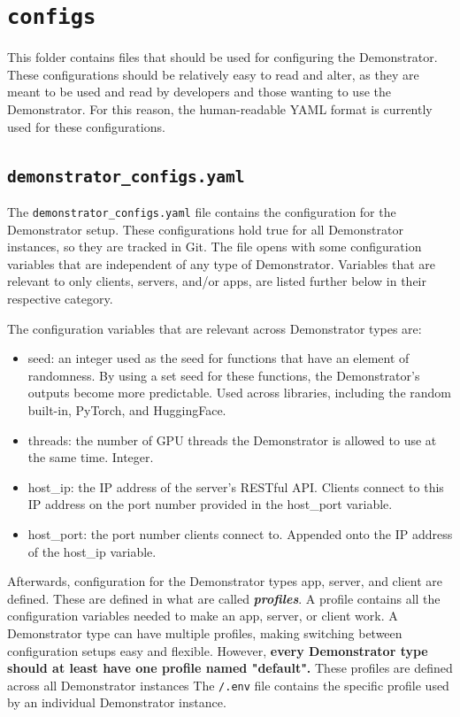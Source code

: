 \section{\texttt{configs}}
This folder contains files that should be used for configuring the Demonstrator.
These configurations should be relatively easy to read and alter, as they are meant to be used and read by developers and those wanting to use the Demonstrator.
For this reason, the human-readable YAML format is currently used for these configurations.

\subsection{\texttt{demonstrator\_configs.yaml}}
The \texttt{demonstrator\_configs.yaml} file contains the configuration for the Demonstrator setup.
These configurations hold true for all Demonstrator instances, so they are tracked in Git.
The file opens with some configuration variables that are independent of any type of Demonstrator.
Variables that are relevant to only clients, servers, and/or apps, are listed further below in their respective category.

The configuration variables that are relevant across Demonstrator types are:
\begin{itemize}
    \item seed: an integer used as the seed for functions that have an element of randomness. By using a set seed for these functions, the Demonstrator's outputs become more predictable. Used across libraries, including the random built-in, PyTorch, and HuggingFace.
    \item threads: the number of GPU threads the Demonstrator is allowed to use at the same time. Integer.
    \item host\_ip: the IP address of the server's RESTful API. Clients connect to this IP address on the port number provided in the host\_port variable.
    \item host\_port: the port number clients connect to. Appended onto the IP address of the host\_ip variable.
\end{itemize}

Afterwards, configuration for the Demonstrator types app, server, and client are defined.
These are defined in what are called \textbf{\textit{profiles}}.
A profile contains all the configuration variables needed to make an app, server, or client work.
A Demonstrator type can have multiple profiles, making switching between configuration setups easy and flexible.
However, \textbf{every Demonstrator type should at least have one profile named "default".}
These profiles are defined across all Demonstrator instances
The \texttt{/.env} file contains the specific profile used by an individual Demonstrator instance.

